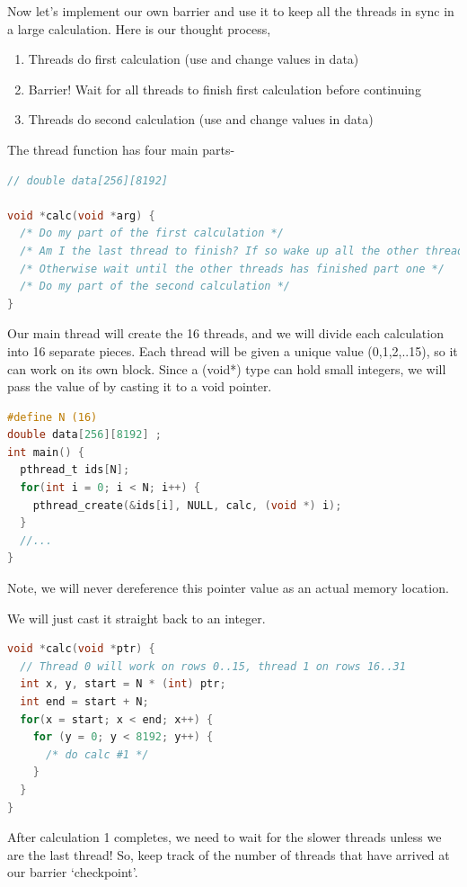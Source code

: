 Now let's implement our own barrier and use it to keep all the threads in sync in a large calculation.
Here is our thought process,

\begin{enumerate}
\item Threads do first calculation (use and change values in data)
\item Barrier! Wait for all threads to finish first calculation before continuing
\item Threads do second calculation (use and change values in data)
\end{enumerate}

The thread function has four main parts-

\begin{lstlisting}[language=C]
// double data[256][8192]

void *calc(void *arg) {
  /* Do my part of the first calculation */
  /* Am I the last thread to finish? If so wake up all the other threads! */
  /* Otherwise wait until the other threads has finished part one */
  /* Do my part of the second calculation */
}
\end{lstlisting}

Our main thread will create the 16 threads, and we will divide each calculation into 16 separate pieces.
Each thread will be given a unique value (0,1,2,..15), so it can work on its own block.
Since a (void*) type can hold small integers, we will pass the value of  by casting it to a void pointer.

\begin{lstlisting}[language=C]
#define N (16)
double data[256][8192] ;
int main() {
  pthread_t ids[N];
  for(int i = 0; i < N; i++) {
    pthread_create(&ids[i], NULL, calc, (void *) i);
  }
  //...
}
\end{lstlisting}

Note, we will never dereference this pointer value as an actual memory location.

We will just cast it straight back to an integer.

\begin{lstlisting}[language=C]
void *calc(void *ptr) {
  // Thread 0 will work on rows 0..15, thread 1 on rows 16..31
  int x, y, start = N * (int) ptr;
  int end = start + N;
  for(x = start; x < end; x++) {
    for (y = 0; y < 8192; y++) {
      /* do calc #1 */
    }
  }
}
\end{lstlisting}

After calculation 1 completes, we need to wait for the slower threads unless we are the last thread!
So, keep track of the number of threads that have arrived at our barrier `checkpoint'.

